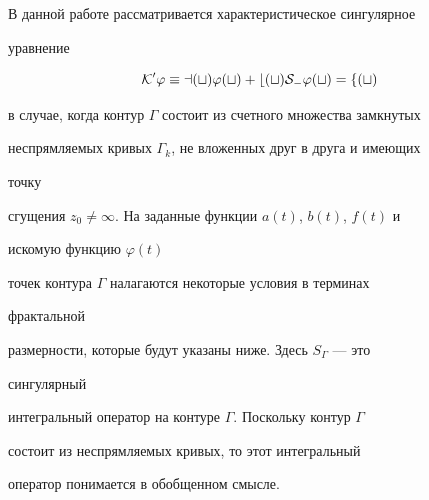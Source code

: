 \date{}







\pagestyle{plain} %













\maketitle


\label{begin}





В данной работе рассматривается характеристическое сингулярное


уравнение


\begin{equation}


\cal K^0\varphi\equiv a(t)\varphi(t)+b(t)S_\Gamma\varphi(t)=f(t)


\end{equation}


в случае, когда контур $\Gamma$ состоит из счетного множества замкнутых


неспрямляемых кривых $\Gamma_k$, не вложенных друг в друга и имеющих


точку


сгущения $z_0\ne\infty$. На заданные функции $a(t)$, $b(t)$, $f(t)$ и


искомую функцию $\varphi(t)$


точек контура $\Gamma$ налагаются некоторые условия в терминах


фрактальной


размерности, которые будут указаны ниже. Здесь $S_\Gamma$ --- это


сингулярный


интегральный оператор на контуре $\Gamma$. Поскольку контур $\Gamma$


состоит из неспрямляемых кривых, то этот интегральный


оператор понимается в обобщенном смысле.


\medskip





